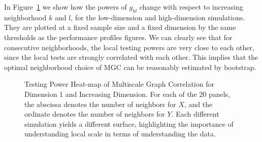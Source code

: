 \documentclass[11pt]{article}
\newcommand{\jv}[1]{{\color{red}{#1}}}
\begin{document}
In Figure~\ref{figSim2} we show how the powers of $g_{kl}$ change with respect to increasing neighborhood $k$ and $l$, for the low-dimension and high-dimension simulations. They are plotted at a fixed sample size and a fixed dimension by the same thresholds as the performance profiles figures. We can clearly see that for consecutive neighborhoods, the local testing powers are very close to each other, since the local tests are strongly correlated with each other. This implies that the optimal neighborhood choice of MGC can be reasonably estimated by bootstrap.

\jv{the point of this section is to convey to the reader that we can assess which scales contain dependencies, unlike others, and justify the results as having some intuition, eg, for the circle and spiral, or the nearly linear ones.  in fact, maybe theorem 2 goes in here?}

\begin{figure}[htbp]
\hfil
{}
\caption{Testing Power Heat-map of Multiscale Graph Correlation for Dimension 1 and Increasing Dimension.
For each of the 20 panels, the abscissa denotes the number of neighbors for $X$, and the ordinate denotes the number of neighbors for $Y$.  Each different simulation yields a different surface, highlighting the importance of understanding local scale in terms of understanding the data.}
\label{figSim2}
\end{figure}
\end{document}
